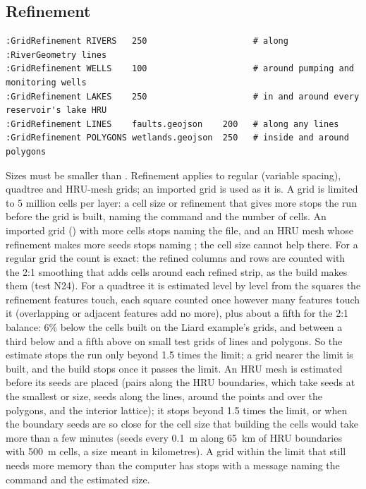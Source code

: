 \subsection{Refinement}
\begin{lstlisting}
:GridRefinement RIVERS   250                     # along :RiverGeometry lines
:GridRefinement WELLS    100                     # around pumping and monitoring wells
:GridRefinement LAKES    250                     # in and around every reservoir's lake HRU
:GridRefinement LINES    faults.geojson    200   # along any lines
:GridRefinement POLYGONS wetlands.geojson  250   # inside and around polygons
\end{lstlisting}
Sizes must be smaller than . Refinement applies to regular (variable spacing), quadtree and HRU-mesh
grids; an imported grid is used as it is. A grid is limited to 5 million cells per layer: a cell size or refinement that
gives more stops the run before the grid is built, naming the command and the number of cells. An imported grid
() with more cells stops naming the file, and an HRU mesh whose refinement makes more seeds stops
naming ; the cell size cannot help there. For a regular grid the
count is exact: the refined columns and rows are counted with the 2:1 smoothing that adds cells around each refined
strip, as the build makes them (test N24). For a quadtree it is estimated level by level from the squares the refinement features touch, each square
counted once however many features touch it (overlapping or adjacent features add no more), plus about a fifth for the
2:1 balance: 6\% below the cells built on the Liard example's grids, and between a third below and a fifth above on small
test grids of lines and polygons. So the estimate stops the run only beyond 1.5 times the limit; a grid nearer the limit
is built, and the build stops once it passes the limit. An HRU mesh is estimated before its seeds are placed (pairs along
the HRU boundaries, which take seeds at the smallest  or  size, seeds along the lines, around the
points and over the polygons, and the interior lattice); it stops beyond 1.5 times the limit, or when the boundary seeds
are so close for the cell size that building the cells would take more than a few minutes (seeds every 0.1~m along
65~km of HRU boundaries with 500~m cells, a size meant in kilometres). A grid within the limit that still needs more
memory than the computer has stops with a message naming the command and the estimated size.

